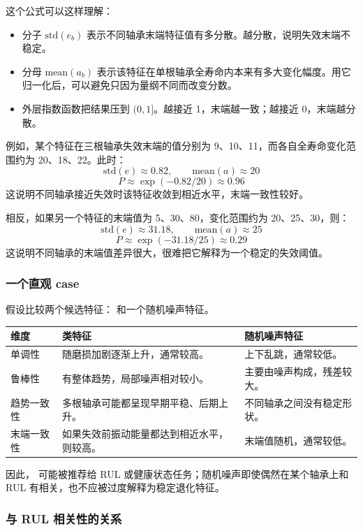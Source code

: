 \documentclass[UTF8,11pt]{ctexart}
\newcommand{\code}[1]{\texttt{\detokenize{#1}}}
\begin{document}
这个公式可以这样理解：
\begin{itemize}
  \item 分子 $\mathrm{std}(e_b)$ 表示不同轴承末端特征值有多分散。越分散，说明失效末端不稳定。
  \item 分母 $\mathrm{mean}(a_b)$ 表示该特征在单根轴承全寿命内本来有多大变化幅度。用它归一化后，可以避免只因为量纲不同而改变分数。
  \item 外层指数函数把结果压到 $(0,1]$。越接近 1，末端越一致；越接近 0，末端越分散。
\end{itemize}

例如，某个特征在三根轴承失效末端的值分别为 9、10、11，而各自全寿命变化范围约为 20、18、22。此时：
\[
\mathrm{std}(e)\approx0.82,\qquad \mathrm{mean}(a)\approx20
\]
\[
P\approx \exp(-0.82/20)\approx0.96
\]
这说明不同轴承接近失效时该特征收敛到相近水平，末端一致性较好。

相反，如果另一个特征的末端值为 5、30、80，变化范围约为 20、25、30，则：
\[
\mathrm{std}(e)\approx31.18,\qquad \mathrm{mean}(a)\approx25
\]
\[
P\approx \exp(-31.18/25)\approx0.29
\]
这说明不同轴承的末端值差异很大，很难把它解释为一个稳定的失效阈值。

\subsubsection{一个直观 case}

假设比较两个候选特征：\code{rms} 和一个随机噪声特征。

\begin{longtable}{L{3.2cm}L{5.5cm}L{5.5cm}}
\toprule
维度 & \code{rms} 类特征 & 随机噪声特征 \\
\midrule
\endhead
单调性 & 随磨损加剧逐渐上升，通常较高。 & 上下乱跳，通常较低。 \\
鲁棒性 & 有整体趋势，局部噪声相对较小。 & 主要由噪声构成，残差较大。 \\
趋势一致性 & 多根轴承可能都呈现早期平稳、后期上升。 & 不同轴承之间没有稳定形状。 \\
末端一致性 & 如果失效前振动能量都达到相近水平，则较高。 & 末端值随机，通常较低。 \\
\bottomrule
\end{longtable}

因此，\code{rms} 可能被推荐给 RUL 或健康状态任务；随机噪声即使偶然在某个轴承上和 RUL 有相关，也不应被过度解释为稳定退化特征。

\subsubsection{与 RUL 相关性的关系}
\end{document}
